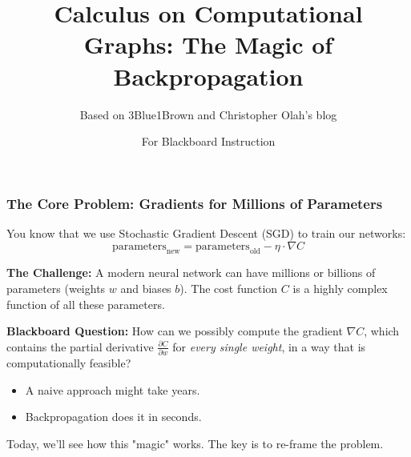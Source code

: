 \documentclass[xcolor=svgnames, 10pt, handout]{beamer}
\title{\textbf{Calculus on Computational Graphs: The Magic of Backpropagation}}
\author{For Blackboard Instruction}
\subtitle{Based on 3Blue1Brown and Christopher Olah's blog}
\date{}
\begin{document}
\maketitle

\begin{frame}
\frametitle{The Core Problem: Gradients for Millions of Parameters}

You know that we use Stochastic Gradient Descent (SGD) to train our networks:
\begin{equation*}
    \text{parameters}_{\text{new}} = \text{parameters}_{\text{old}} - \eta \cdot \nabla C
\end{equation*}

\textbf{The Challenge:}
A modern neural network can have millions or billions of parameters (weights $w$ and biases $b$).
The cost function $C$ is a highly complex function of all these parameters.

\vspace{1cm}

\textbf{Blackboard Question:} How can we possibly compute the gradient $\nabla C$, which contains the partial derivative $\frac{\partial C}{\partial w}$ for \textit{every single weight}, in a way that is computationally feasible?
\begin{itemize}
    \item A naive approach might take years.
    \item Backpropagation does it in seconds.
\end{itemize}

\vspace{1cm}
Today, we'll see how this "magic" works. The key is to re-frame the problem.

\end{frame}
\end{document}
